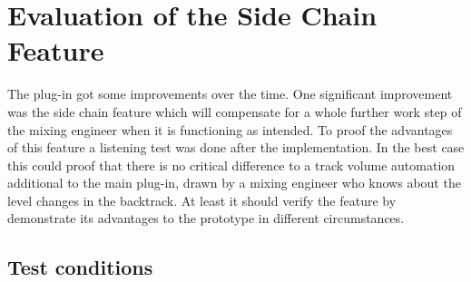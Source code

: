 \chapter{Evaluation of the Side Chain Feature}
\label{chapter:evaluation}

The plug-in got some improvements over the time. One significant improvement was the side chain feature which will compensate for a whole further work step of the mixing engineer when it is functioning as intended. To proof the advantages of this feature a listening test was done after the implementation. In the best case this could proof that there is no critical difference to a track volume automation additional to the main plug-in, drawn by a mixing engineer who knows about the level changes in the backtrack. At least it should verify the feature by demonstrate its advantages to the prototype in different circumstances.\\

\section{Test conditions}

